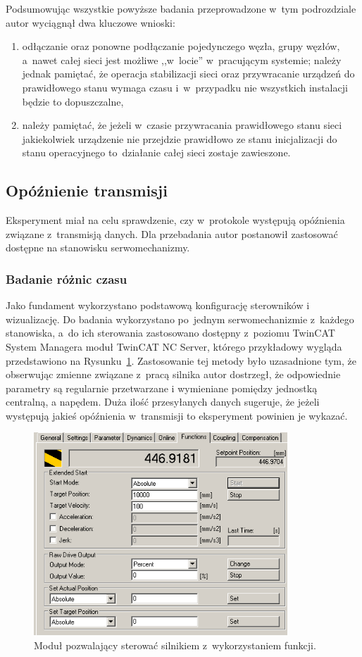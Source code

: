 Podsumowując wszystkie powyższe badania przeprowadzone w~tym podrozdziale autor wyciągnął dwa kluczowe wnioski:
\begin{enumerate}
\item odłączanie oraz ponowne podłączanie pojedynczego węzła, grupy węzłów, a~nawet całej sieci jest możliwe ,,w~locie'' w~pracującym systemie; należy jednak pamiętać, że operacja stabilizacji sieci oraz przywracanie urządzeń do prawidłowego stanu wymaga czasu i~w~przypadku nie wszystkich instalacji będzie to dopuszczalne,
\item należy pamiętać, że jeżeli w~czasie przywracania prawidłowego stanu sieci jakiekolwiek urządzenie nie przejdzie prawidłowo ze stanu inicjalizacji do stanu operacyjnego to~działanie całej sieci zostaje zawieszone.
\end{enumerate}
\subsection{Opóźnienie transmisji}
Eksperyment miał na celu sprawdzenie, czy w~protokole występują opóźnienia związane z~transmisją danych. Dla przebadania autor postanowił zastosować dostępne na stanowisku serwomechanizmy. 
\subsubsection{Badanie różnic czasu}
Jako fundament wykorzystano podstawową konfigurację sterowników i wizualizację. Do badania wykorzystano po~jednym serwomechanizmie z~każdego stanowiska, a~do ich sterowania zastosowano dostępny z~poziomu TwinCAT System Managera moduł TwinCAT NC Server, którego przykładowy wygląda przedstawiono na Rysunku~\ref{axis_function}. Zastosowanie tej metody było uzasadnione tym, że obserwując zmienne związane z~pracą silnika autor dostrzegł, że odpowiednie parametry są regularnie przetwarzane i wymieniane pomiędzy jednostką centralną, a napędem. Duża ilość przesyłanych danych sugeruje, że jeżeli występują jakieś opóźnienia w~transmisji to eksperyment powinien je wykazać.

\begin{figure}[!htb] 	\centering 	\includegraphics[width=0.85\textwidth]{images/axis_function} \caption{Moduł pozwalający sterować silnikiem z~wykorzystaniem funkcji.} \label{axis_function} \end{figure}

